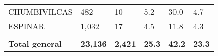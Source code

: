 \begin{tabular}{llllll}
	\cellcolor[HTML]{C6E0B4}CHUMBIVILCAS                           & 482                                                                   & 10                                                               & 5.2                                                                              & 30.0                                                                        & 4.7                                                                                 \\
	\cellcolor[HTML]{C6E0B4}ESPINAR                                & 1,032                                                                 & 17                                                               & 4.5                                                                              & 11.8                                                                        & 4.3                                                                                 \\
	&                                                                       &                                                                  &                                                                                  &                                                                             &                                                                                     \\
	\rowcolor[HTML]{DDEBF7} 
	\textbf{Total   general}                                       & \textbf{23,136}                                                       & \textbf{2,421}                                                   & \textbf{25.3}                                                                    & \textbf{42.2}                                                               & \textbf{23.3}                                                                      
\end{tabular}
